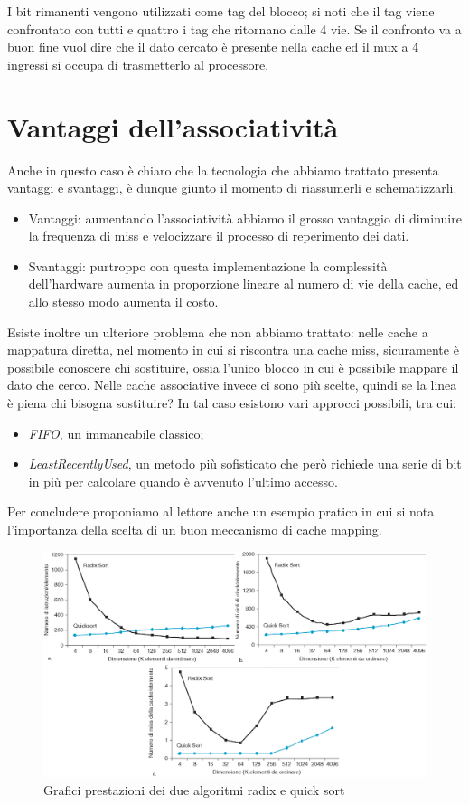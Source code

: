 \documentclass[class=book, crop=false, oneside]{standalone}
\begin{document}
I bit rimanenti vengono utilizzati come tag del blocco; si noti che il tag viene confrontato con tutti e quattro i tag che ritornano dalle 4 vie.
Se il confronto va a buon fine vuol dire che il dato cercato è presente nella cache ed il mux a 4 ingressi si occupa di trasmetterlo al processore.

\section{Vantaggi dell'associatività}
Anche in questo caso è chiaro che la tecnologia che abbiamo trattato presenta vantaggi e svantaggi, è dunque giunto il momento di riassumerli e schematizzarli.
\begin{itemize}
	\item Vantaggi: aumentando l’associatività abbiamo il grosso vantaggio di diminuire la frequenza di miss e velocizzare il processo di reperimento dei dati.
	\item Svantaggi: purtroppo con questa implementazione la complessità dell'hardware aumenta in proporzione lineare al numero di vie della cache, ed allo stesso modo aumenta il costo.
\end{itemize}
Esiste inoltre un ulteriore problema che non abbiamo trattato: nelle cache a mappatura diretta, nel momento in cui si riscontra una cache miss, sicuramente è possibile conoscere chi sostituire, ossia l’unico blocco in cui è possibile mappare il dato che cerco. Nelle cache associative invece ci sono più scelte, quindi se la linea è piena chi bisogna sostituire? In tal caso esistono vari approcci possibili, tra cui:
\begin{itemize}
	\item \emph{FIFO}, un immancabile classico;
	\item \emph{LeastRecentlyUsed}, un metodo più sofisticato che però richiede una serie di bit in più per calcolare quando è avvenuto l'ultimo accesso.
\end{itemize}
Per concludere proponiamo al lettore anche un esempio pratico in cui si nota l'importanza della scelta di un buon meccanismo di cache mapping.
\begin{figure}
	\centering
	\includegraphics[width=\linewidth,keepaspectratio]{grafici-trittico}
	\caption{Grafici prestazioni dei due algoritmi radix e quick sort}
\end{figure}
\end{document}
